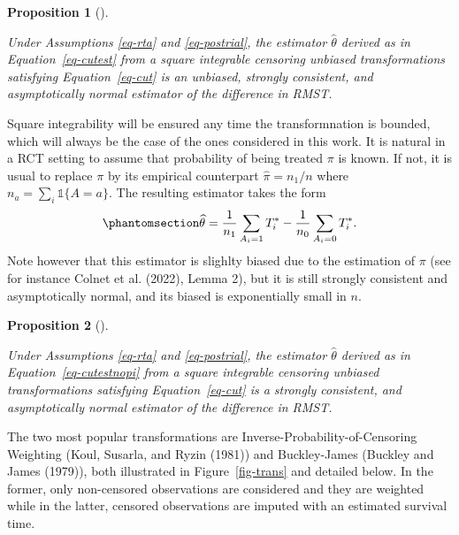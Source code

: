\documentclass[
  11pt,
  a4paper,
]{article}
\theoremstyle{plain}
\theoremstyle{plain}
\theoremstyle{plain}
\newtheorem{proposition}{Proposition}[section]
\theoremstyle{definition}
\theoremstyle{remark}
\begin{document}
\begin{proposition}[]\protect\hypertarget{prp-cutest}{}\label{prp-cutest}

Under Assumptions \ref{eq-rta} and \ref{eq-postrial}, the estimator
\(\widehat\theta\) derived as in Equation~\ref{eq-cutest} from a square
integrable censoring unbiased transformations satisfying
Equation~\ref{eq-cut} is an unbiased, strongly consistent, and
asymptotically normal estimator of the difference in RMST.

\end{proposition}

Square integrability will be ensured any time the transformnation is
bounded, which will always be the case of the ones considered in this
work. It is natural in a RCT setting to assume that probability of being
treated \(\pi\) is known. If not, it is usual to replace \(\pi\) by its
empirical counterpart \(\widehat\pi = n_1/n\) where
\(n_a = \sum_{i} \mathbb{1}\{A=a\}\). The resulting estimator takes the
form \begin{equation}\phantomsection\label{eq-cutestnopi}{
\widehat\theta = \frac1{n_1}\sum_{A_i = 1}  T^*_i - \frac1{n_0}\sum_{A_i = 0}  T^*_i.
}\end{equation} Note however that this estimator is slighlty biased due
to the estimation of \(\pi\) (see for instance Colnet et al. (2022),
Lemma 2), but it is still strongly consistent and asymptotically normal,
and its biased is exponentially small in \(n\).

\begin{proposition}[]\protect\hypertarget{prp-cutestnopi}{}\label{prp-cutestnopi}

Under Assumptions \ref{eq-rta} and \ref{eq-postrial}, the estimator
\(\widehat\theta\) derived as in Equation~\ref{eq-cutestnopi} from a
square integrable censoring unbiased transformations satisfying
Equation~\ref{eq-cut} is a strongly consistent, and asymptotically
normal estimator of the difference in RMST.

\end{proposition}

The two most popular transformations are
Inverse-Probability-of-Censoring Weighting (Koul, Susarla, and Ryzin
(1981)) and Buckley-James (Buckley and James (1979)), both illustrated
in Figure~\ref{fig-trans} and detailed below. In the former, only
non-censored observations are considered and they are weighted while in
the latter, censored observations are imputed with an estimated survival
time.
\end{document}
